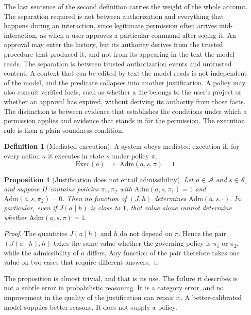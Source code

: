 \documentclass[11pt]{article}
\newtheorem{proposition}{Proposition}
\theoremstyle{definition}
\newtheorem{definition}{Definition}
\theoremstyle{remark}
\newcommand{\Adm}{\mathrm{Adm}}
\newcommand{\Exec}{\mathrm{Exec}}
\newcommand{\Pol}{\Pi}
\begin{document}
The last sentence of the second definition carries the weight of the whole account. The separation required is not between authorization and everything that happens during an interaction, since legitimate permission often arrives mid-interaction, as when a user approves a particular command after seeing it. An approval may enter the history, but its authority derives from the trusted procedure that produced it, and not from its appearing in the text the model reads. The separation is between trusted authorization events and untrusted content. A context that can be edited by text the model reads is not independent of the model, and the predicate collapses into another justification. A policy may also consult verified facts, such as whether a file belongs to the user's project or whether an approval has expired, without deriving its authority from those facts. The distinction is between evidence that establishes the conditions under which a permission applies and evidence that stands in for the permission. The execution rule is then a plain soundness condition.

\begin{definition}[Mediated execution]
A system obeys mediated execution if, for every action $a$ it executes in state $s$ under policy $\pi$,
\[
\Exec(a)\;\Longrightarrow\;\Adm(a,s,\pi)=1 .
\]
\end{definition}

\begin{proposition}[Justification does not entail admissibility]\label{prop:indep}
Let $a\in\mathcal{A}$ and $s\in\mathcal{S}$, and suppose $\Pol$ contains policies $\pi_1,\pi_2$ with $\Adm(a,s,\pi_1)=1$ and $\Adm(a,s,\pi_2)=0$. Then no function of $(J,h)$ determines $\Adm(a,s,\cdot)$. In particular, even if $J(a\mid h)$ is close to $1$, that value alone cannot determine whether $\Adm(a,s,\pi)=1$.
\end{proposition}

\begin{proof}
The quantities $J(a\mid h)$ and $h$ do not depend on $\pi$. Hence the pair $(J(a\mid h),h)$ takes the same value whether the governing policy is $\pi_1$ or $\pi_2$, while the admissibility of $a$ differs. Any function of the pair therefore takes one value on two cases that require different answers.
\end{proof}

The proposition is almost trivial, and that is its use. The failure it describes is not a subtle error in probabilistic reasoning. It is a category error, and no improvement in the quality of the justification can repair it. A better-calibrated model supplies better reasons. It does not supply a policy.
\end{document}
